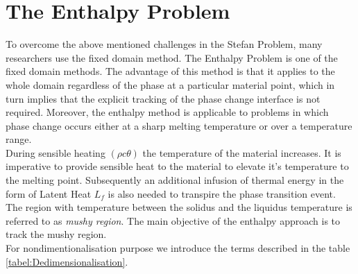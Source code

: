  \section{The Enthalpy Problem \label{sec:tech}}
 To overcome the above mentioned challenges in the Stefan Problem, many researchers use the  fixed domain method. The Enthalpy Problem is one of the fixed domain methods. The advantage of this method is that it applies to the whole domain regardless of the phase at a particular material point, which in turn implies that the explicit tracking of the phase
change interface is not required. Moreover, the enthalpy method is applicable to problems in which phase change occurs either at a sharp melting temperature or over a temperature range\cite{_2000}.\\  
During sensible heating $(\rho c \theta)$ the temperature of the material increases. It is imperative to provide sensible heat to the material to elevate it's temperature to the melting point. Subsequently an additional infusion of thermal energy in the form of Latent Heat $L_f$ is also needed to transpire the phase transition event.\\
The region with temperature between the solidus and the liquidus temperature is referred to as \textit{mushy region}\cite{verhoeven2003modelling}. The main objective of the enthalpy approach is to track the mushy region. \\ 
For nondimentionalisation purpose we introduce the  terms described in the table \ref{tabel:Dedimensionalisation}.\\
